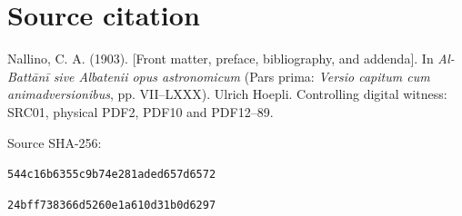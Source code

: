 \documentclass[11pt]{article}
\begin{document}
\section*{Source citation}
Nallino, C. A. (1903). [Front matter, preface, bibliography, and addenda]. In \textit{Al-Battānī sive Albatenii opus astronomicum} (Pars prima: \textit{Versio capitum cum animadversionibus}, pp. VII–LXXX). Ulrich Hoepli. Controlling digital witness: SRC01, physical PDF2, PDF10 and PDF12–89.

{\small\raggedright Source SHA-256:\par\texttt{544c16b6355c9b74e281aded657d6572}\par\texttt{24bff738366d5260e1a610d31b0d6297}\par}
\end{document}
